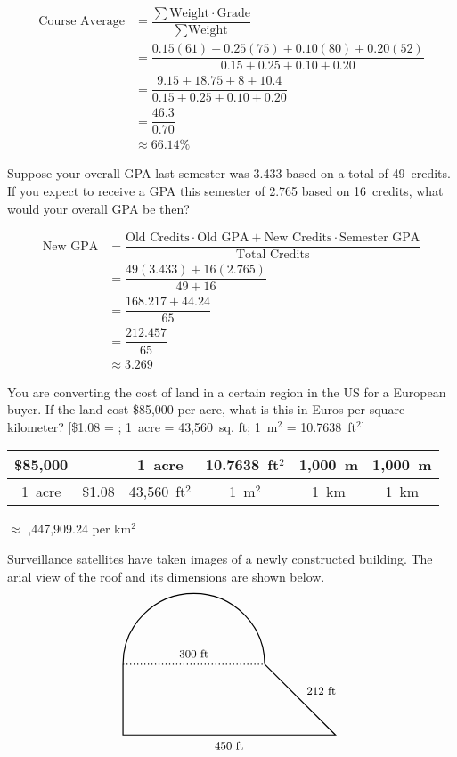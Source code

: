 \documentclass[12pt,letterpaper]{exam}
\begin{document}
\begin{questions}
\sol 
	\[
	\begin{aligned}
	\text{Course Average}&= \dfrac{\sum \text{Weight} \cdot \text{Grade}}{\sum \text{Weight}} \\[0.3cm]
	&= \dfrac{0.15(61) + 0.25(75) + 0.10(80) + 0.20(52)}{0.15 + 0.25 + 0.10 + 0.20} \\[0.3cm]
	&= \dfrac{9.15 + 18.75 + 8 + 10.4}{0.15 + 0.25 + 0.10 + 0.20} \\[0.3cm]
	&= \dfrac{46.3}{0.70} \\[0.3cm]
	&\approx 66.14\%
	\end{aligned}
	\]



\newpage
\question[10] Suppose your overall GPA last semester was 3.433 based on a total of 49~credits. If you expect to receive a GPA this semester of 2.765 based on 16~credits, what would your overall GPA be then? \pspace

\sol 
	\[
	\begin{aligned}
	\text{New GPA}&= \dfrac{\text{Old Credits} \cdot \text{Old GPA} + \text{New Credits} \cdot \text{Semester GPA}}{\text{Total Credits}} \\[0.3cm]
	&= \dfrac{49(3.433) + 16(2.765)}{49 + 16} \\[0.3cm]
	&= \dfrac{168.217 + 44.24}{65} \\[0.3cm]
	&= \dfrac{212.457}{65} \\[0.3cm]
	&\approx 3.269
	\end{aligned}
	\]



\newpage
\question[10] You are converting the cost of land in a certain region in the US for a European buyer. If the land cost \$85,000 per acre, what is this in Euros per square kilometer? [\$1.08 = ; 1~acre = 43,560~sq. ft; 1~m$^2$ = 10.7638~ft$^2$] \pspace

\sol \par
	\begin{table}[ht]
	\centering
	\small
	\begin{tabular}{c||c|c|c|c|c}
	\$85,000 & \texteuro 1 & 1~acre & 10.7638~ft$^2$   & 1,000~m & 1,000~m \\ \hline
	1~acre & \$1.08 & 43,560~ft$^2$ & 1~m$^2$           & 1~km      & 1~km
	\end{tabular} $\approx$
	,447,909.24 per km$^2$
	\end{table}



\newpage
\question[10] Surveillance satellites have taken images of a newly constructed building. The arial view of the roof and its dimensions are shown below.
	\[
	\begin{tikzpicture}
	\draw[line width=0.03cm] (0,2) -- (0,0) -- (4,0) -- (6,0) -- (4,2);
	\draw[line width=0.03cm] (4,2) arc (0:180:2);
	\draw[line width=0.03cm,dotted] (0,2) -- (4,2);
	\node at (2,2.3) {\small 300~ft};
	\node at (3,-0.3) {\small 450~ft};
	\node at (5.6,1.25) {\small 212~ft};
	

\end{tikzpicture}\]
\end{questions}
\end{document}
